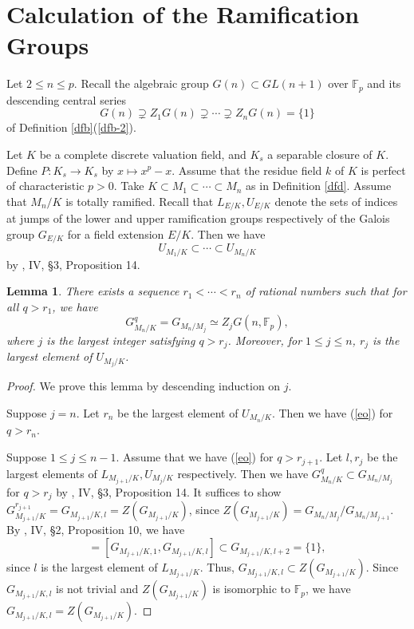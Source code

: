 \documentclass[sn-mathphys-num]{sn-jnl}
\numberwithin{equation}{section}
\theoremstyle{plain}
\newtheorem{lemm}[theo]{Lemma}
\theoremstyle{definition}
\begin{document}
      

        



\section{Calculation of the Ramification Groups}\label{sc}
Let $2\leq n\leq p$. Recall the algebraic group $G(n)\subset GL(n+1)$ over $\mathbb{F}_p$ and its descending central series 
\begin{equation}
G(n)\supsetneq Z_1G(n)\supsetneq\cdots\supsetneq Z_nG(n)=\{1\}
\end{equation}
of Definition \ref{dfb}(\ref{dfb-2}).  

Let $K$ be a complete discrete valuation field, and $K_s$ a separable closure of $K$. Define $P:K_s\to K_s$ by $x\mapsto x^p-x$.  Assume that the residue field $k$ of $K$ is perfect of characteristic $p>0$. Take $K\subset M_1\subset\cdots\subset M_n$ as in Definition \ref{dfd}. Assume that $M_n/K$ is totally ramified. Recall that $L_{E/K},U_{E/K}$ denote the sets of indices at jumps of the lower and upper ramification groups respectively of the Galois group $G_{E/K}$ for a field extension $E/K$. Then we have
\begin{equation}
U_{M_1/K}\subset\cdots\subset U_{M_n/K}
\end{equation}
by \cite{Se}, IV, \S 3, Proposition 14.       


\begin{lemm}\label{lad}
  There exists a sequence $r_1<\cdots<r_n$ of rational numbers such that for all $q>r_1$, we have
  \begin{equation}\label{eo}
  G_{M_n/K}^{q}=G_{M_n/M_j}\simeq  Z_jG(n,\mathbb{F}_p),
  \end{equation}
  where $j$ is the largest integer satisfying $q>r_j$. Moreover, for $1\leq j\leq n$, $r_j$ is the largest element of $U_{M_j/K}$.
\end{lemm}

\begin{proof}
  We prove this lemma by descending induction on $j$.

  Suppose $j=n$. Let $r_n$ be the largest element of $U_{M_{n}/K}$. Then we have (\ref{eo}) for $q>r_n$.
  
  Suppose $1\leq j\leq n-1$. Assume that we have (\ref{eo}) for $q>r_{j+1}$. Let $l,r_j$ be the largest elements of $L_{M_{j+1}/K},U_{M_{j}/K}$ respectively. Then we have $G_{M_n/K}^{q}\subset G_{M_n/M_j}$ for $q>r_j$ by \cite{Se}, IV, \S 3, Proposition 14. It suffices to show $G_{M_{j+1}/K}^{r_{j+1}}=G_{M_{j+1}/K,l}=Z(G_{M_{j+1}/K})$, since $Z(G_{M_{j+1}/K})=G_{M_n/M_{j}}/G_{M_n/M_{j+1}}$. By \cite{Se}, IV, \S 2, Proposition 10, we have
  \begin{equation}
    [G_{M_{j+1}/K},G_{M_{j+1}/K,l}]=[G_{M_{j+1}/K,1},G_{M_{j+1}/K,l}]\subset G_{M_{j+1}/K,l+2}=\{1\},
  \end{equation}
  since $l$ is the largest element of $L_{M_{j+1}/K}$. Thus, $G_{M_{j+1}/K,l}\subset Z(G_{M_{j+1}/K})$. Since $G_{M_{j+1}/K,l}$ is not trivial and $Z(G_{M_{j+1}/K})$ is isomorphic to $\mathbb{F}_p$, we have $G_{M_{j+1}/K,l}=Z(G_{M_{j+1}/K})$.
\end{proof}
\end{document}
